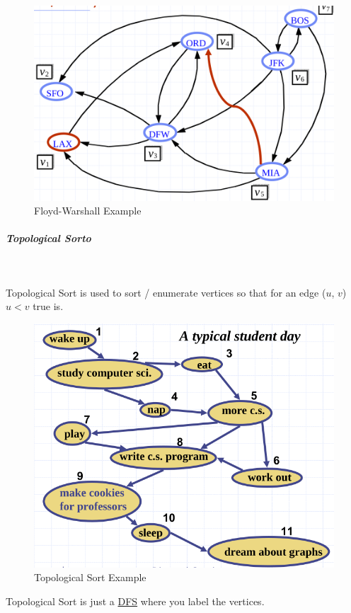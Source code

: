 \documentclass[11pt,twoside,twocolumn,landscape]{article}
\begin{document}
\begin{figure}[htbp]
\centering
\includegraphics[width=.9\linewidth]{img/floyd_warshall.png}
\caption{\label{fig:org45157a4}Floyd-Warshall Example}
\end{figure}

\subparagraph{Topological Sorto} \
\label{sec:orgfc97db0}

Topological Sort is used to sort / enumerate vertices so that for an edge (\(u\), \(v\)) \(u < v\) true is.


\begin{figure}[htbp]
\centering
\includegraphics[width=.9\linewidth]{img/topological_sort_example.png}
\caption{\label{fig:orgb15c077}Topological Sort Example}
\end{figure}


Topological Sort is just a \href{../../../roam/20220202095038-dfs.org}{DFS} where you label the vertices.
\end{document}

